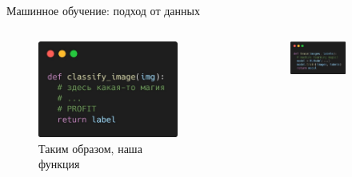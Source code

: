 \documentclass[aspectratio=169]{beamer}
\begin{document}
\begin{frame}{Машинное обучение: подход от данных}
    \begin{columns}[T]
        \begin{column}{.4\linewidth}
            \begin{figure}
                \caption*{Таким образом, наша функция}
                \includegraphics[width=\linewidth]{graphs/fig6_1.jpg}
            \end{figure}
        \end{column}
        \pause{}
        \begin{column}{.6\linewidth}
            \begin{figure}
                \caption*{превращается в две:}
                \begin{subfigure}[t]{.57\linewidth}
                    \includegraphics[width=\linewidth]{graphs/fig15_0.jpg}
                \end{subfigure}

\end{figure}
\end{column}
\end{columns}
\end{frame}
\end{document}
